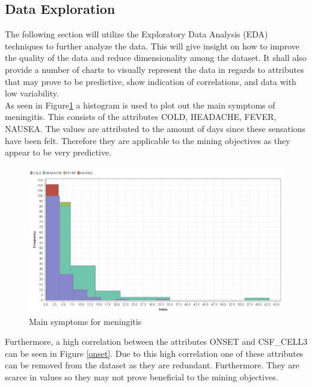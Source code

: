 \subsection*{Data Exploration}
The following section will utilize the Exploratory Data Analysis (EDA) techniques to further analyze the data. This will give insight on how to improve the quality of the data and reduce dimensionality among the dataset. It shall also provide a number of charts to visually represent the data in regards to attributes that may prove to be predictive, show indication of correlations, and data with low variability. \\
As seen in Figure\ref{symp} a histogram is used to plot out the main symptoms of meningitis. This consists of the attributes COLD, HEADACHE, FEVER, NAUSEA. The values are attributed to the amount of days since these sensations have been felt. Therefore they are applicable to the mining objectives as they appear to be very predictive.
\begin{figure}[ht]
	\begin{center}
		\advance\leftskip-3cm
		\advance\rightskip-3cm
		\includegraphics[keepaspectratio=true,scale=0.6]{__resources/symptoms.jpg}
		\caption{Main symptoms for meningitis}
		\label{symp}
	\end{center}
\end{figure}
\newpage
Furthermore, a high correlation between the attributes ONSET and CSF\_CELL3 can be seen in Figure \ref{onset}. Due to this high correlation one of these attributes can be removed from the dataset as they are redundant. Furthermore. They are scarce in values so they may not prove beneficial to the mining objectives.
